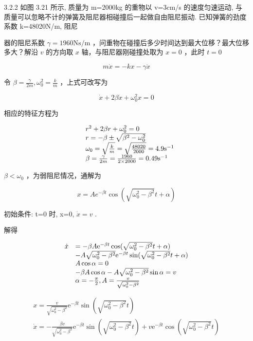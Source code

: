 \begin{problem}{3.2.2}
如图 3.21 所示, 质量为 m=2000kg 的重物以 v=3cm/s 的速度匀速运动, 与质量可以忽略不计的弹簧及阻尼器相碰撞后一起做自由阻尼振动. 已知弹簧的劲度系数 k=48020N/m, 阻尼

器的阻尼系数 $\gamma = 1960\mathrm{N}\mathrm{s / m}$ ，问重物在碰撞后多少时间达到最大位移？最大位移多大？解沿 $v$ 的方向取 $x$ 轴，与阻尼器刚碰撞处取为 $x = 0$ ，此时 $t = 0$ 

\[
m \dot {x} = - k x - \gamma \dot {x}
\]

令 $\beta = \frac{\gamma}{2m},\omega_0^2 = \frac{k}{m}$ ，上式可改写为

\[
\dot {x} + 2 \beta \dot {x} + \omega_ {0} ^ {2} x = 0
\]

相应的特征方程为

\[
\begin{array}{r l} & r ^ {2} + 2 \beta r + \omega_ {0} ^ {2} = 0 \\ & r = - \beta \pm \sqrt {\beta^ {2} - \omega_ {0} ^ {2}} \\ & \omega_ {0} = \sqrt {\frac {k}{m}} = \sqrt {\frac {4 8 0 2 0}{2 0 0 0}} = 4. 9 \mathrm{s} ^ {- 1} \\ & \beta = \frac {\gamma}{2 m} = \frac {1 9 6 0}{2 \times 2 0 0 0} = 0. 4 9 \mathrm{s} ^ {- 1} \end{array}
\]

$\beta<\omega_{0}$ ，为弱阻尼情况，通解为

\[
x = A e ^ {- \beta t} \cos (\sqrt {\omega_ {0} ^ {2} - \beta^ {2}} t + \alpha)
\]

初始条件: t=0 时, x=0, $\dot{x}=v$ .

解得

\[
\begin{array}{r l} \dot {x} & = - \beta A \mathrm{e} ^ {- \beta t} \cos (\sqrt {\omega_ {0} ^ {2} - \beta^ {2}} t + \alpha) \\ & - A \sqrt {\omega_ {0} ^ {2} - \beta^ {2}} \mathrm{e} ^ {- \beta t} \sin (\sqrt {\omega_ {0} ^ {2} - \beta^ {2}} t + \alpha) \\ & A \cos \alpha = 0 \\ & - \beta A \cos \alpha - A \sqrt {\omega_ {0} ^ {2} - \beta^ {2}} \sin \alpha = v \\ & \alpha = - \frac {\pi}{2}, A = \frac {v}{\sqrt {\omega_ {0} ^ {2} - \beta^ {2}}} \end{array}
\]

\[
\begin{array}{c} x = \frac {v}{\sqrt {\omega_ {0} ^ {2} - \beta^ {2}}} \mathrm{e} ^ {- \beta t} \sin (\sqrt {\omega_ {0} ^ {2} - \beta^ {2}} t) \\ \dot {x} = - \frac {\beta v}{\sqrt {\omega_ {0} ^ {2} - \beta^ {2}}} \mathrm{e} ^ {- \beta t} \sin (\sqrt {\omega_ {0} ^ {2} - \beta^ {2}} t) + v \mathrm{e} ^ {- \beta t} \cos (\sqrt {\omega_ {0} ^ {2} - \beta^ {2}} t) \end{array}
\]


\end{problem}

